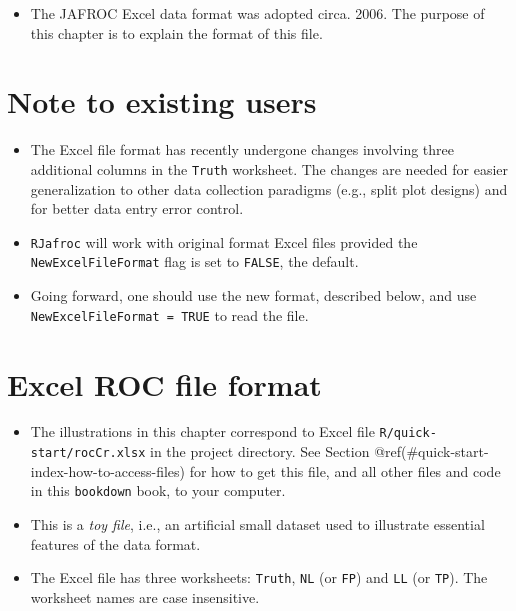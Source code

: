 \documentclass[
]{book}
\providecommand{\tightlist}{%
  \setlength{\itemsep}{0pt}\setlength{\parskip}{0pt}}
\begin{document}
\begin{itemize}
\tightlist
\item
  The JAFROC Excel data format was adopted circa. 2006. The purpose of this chapter is to explain the format of this file.
\end{itemize}

\hypertarget{quick-start-roc-note}{%
\section{Note to existing users}\label{quick-start-roc-note}}

\begin{itemize}
\tightlist
\item
  The Excel file format has recently undergone changes involving three additional columns in the \texttt{Truth} worksheet. The changes are needed for easier generalization to other data collection paradigms (e.g., split plot designs) and for better data entry error control.
\item
  \texttt{RJafroc} will work with original format Excel files provided the \texttt{NewExcelFileFormat} flag is set to \texttt{FALSE}, the default.
\item
  Going forward, one should use the new format, described below, and use \texttt{NewExcelFileFormat\ =\ TRUE} to read the file.
\end{itemize}

\hypertarget{quick-start-roc-excel}{%
\section{Excel ROC file format}\label{quick-start-roc-excel}}

\begin{itemize}
\tightlist
\item
  The illustrations in this chapter correspond to Excel file \texttt{R/quick-start/rocCr.xlsx} in the project directory. See Section @ref(\#quick-start-index-how-to-access-files) for how to get this file, and all other files and code in this \texttt{bookdown} book, to your computer.
\item
  This is a \emph{toy file}, i.e., an artificial small dataset used to illustrate essential features of the data format.
\item
  The Excel file has three worksheets: \texttt{Truth}, \texttt{NL} (or \texttt{FP}) and \texttt{LL} (or \texttt{TP}). The worksheet names are case insensitive.
\end{itemize}
\end{document}
